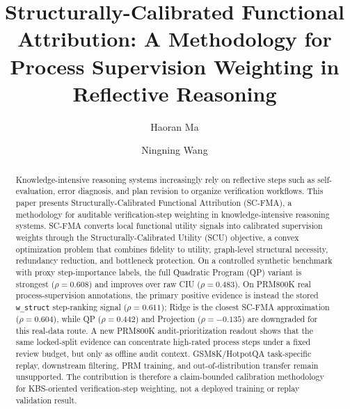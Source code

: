 \documentclass[a4paper,fleqn]{cas-sc}
\begin{document}
\let\WriteBookmarks\relax
\def\floatpagepagefraction{1}
\def\textpagefraction{.001}


\title[mode=title]{Structurally-Calibrated Functional Attribution: A Methodology for Process Supervision Weighting in Reflective Reasoning}

\author[1]{Haoran Ma}

\author[1,2]{Ningning Wang}




\begin{abstract}
Knowledge-intensive reasoning systems increasingly rely on reflective steps such as self-evaluation, error diagnosis, and plan revision to organize verification workflows. This paper presents Structurally-Calibrated Functional Attribution (SC-FMA), a methodology for auditable verification-step weighting in knowledge-intensive reasoning systems. SC-FMA converts local functional utility signals into calibrated supervision weights through the Structurally-Calibrated Utility (SCU) objective, a convex optimization problem that combines fidelity to utility, graph-level structural necessity, redundancy reduction, and bottleneck protection. On a controlled synthetic benchmark with proxy step-importance labels, the full Quadratic Program (QP) variant is strongest ($\rho=0.608$) and improves over raw CIU ($\rho=0.483$). On PRM800K real process-supervision annotations, the primary positive evidence is instead the stored \texttt{w\_struct} step-ranking signal ($\rho=0.611$); Ridge is the closest SC-FMA approximation ($\rho=0.604$), while QP ($\rho=0.442$) and Projection ($\rho=-0.135$) are downgraded for this real-data route. A new PRM800K audit-prioritization readout shows that the same locked-split evidence can concentrate high-rated process steps under a fixed review budget, but only as offline audit context. GSM8K/HotpotQA task-specific replay, downstream filtering, PRM training, and out-of-distribution transfer remain unsupported. The contribution is therefore a claim-bounded calibration methodology for KBS-oriented verification-step weighting, not a deployed training or replay validation result.
\end{abstract}
\end{document}
